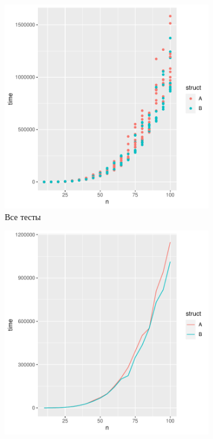 \documentclass[specialist,
substylefile = spbu.rtx,
               subf,href,colorlinks=true, 12pt]{disser}
\begin{document}
    \begin{figure}[h]
        \begin{minipage}[t]{\columnwidth}%
        \begin{subfigure}[t]{0.475\linewidth}%
            \includegraphics[width=\linewidth]{point.pdf}
            \caption{Все тесты}
        \end{subfigure}%
        \hfill
        \begin{subfigure}[t]{0.475\linewidth}%
            \includegraphics[width=\linewidth]{line.pdf}

\end{subfigure}
\end{minipage}
\end{figure}
\end{document}
